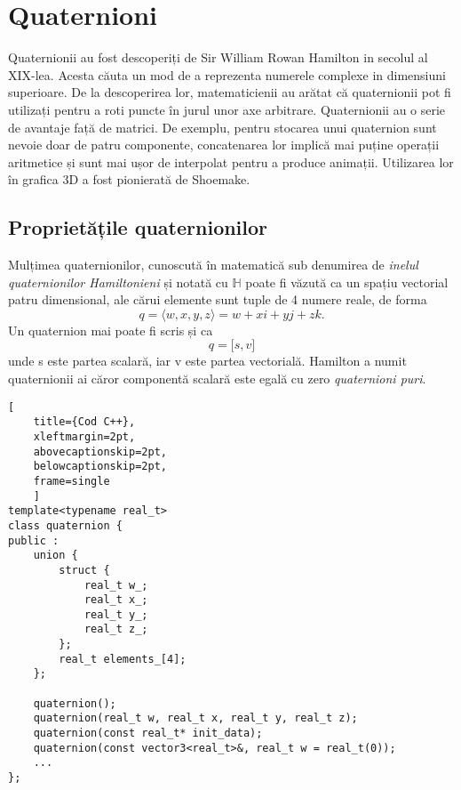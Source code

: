 \section{Quaternioni}
\label{ch1:quaternions}
\indent

Quaternionii au fost descoperiți de Sir William Rowan Hamilton in secolul al
XIX-lea. Acesta căuta un mod de a reprezenta numerele complexe in dimensiuni
superioare. De la descoperirea lor, matematicienii au arătat că quaternionii pot
fi utilizați pentru a roti puncte în jurul unor axe arbitrare.
Quaternionii au o serie de avantaje față de matrici. De exemplu, pentru
stocarea unui quaternion sunt nevoie doar de patru componente, concatenarea lor
implică mai puține operații aritmetice și sunt mai ușor de interpolat pentru a
produce animații. Utilizarea lor în grafica 3D a fost pionierată de
 Shoemake.

\subsection{Proprietățile quaternionilor}
\label{ch1:quaternions:properties}
\indent

Mulțimea quaternionilor, cunoscută în matematică sub denumirea de \textit{inelul
quaternionilor Hamiltonieni} și notată cu $\mathbb{H}$ poate fi văzută ca
un spațiu vectorial patru dimensional, ale cărui elemente sunt tuple de 4
numere reale, de forma 
\begin{equation}
q = \langle w, x, y, z\rangle = w + x\mathit{i} + y\mathit{j} + z\mathit{k}.
\end{equation}
Un quaternion mai poate fi scris și ca 
\begin{equation}
q = \lbrack s, v \rbrack
\end{equation} unde s este partea scalară, iar v este partea vectorială.
Hamilton a numit quaternionii ai căror componentă scalară este egală cu zero
\textit{quaternioni puri}.
\begin{lstlisting}[
    title={Cod C++}, 
    xleftmargin=2pt,
    abovecaptionskip=2pt,
    belowcaptionskip=2pt,
    frame=single
    ]
template<typename real_t>
class quaternion {
public :
    union {
        struct {
            real_t w_;
            real_t x_;
            real_t y_;
            real_t z_;
        };
        real_t elements_[4];
    };

    quaternion();
    quaternion(real_t w, real_t x, real_t y, real_t z);
    quaternion(const real_t* init_data);
    quaternion(const vector3<real_t>&, real_t w = real_t(0));
    ...
};
\end{lstlisting}

